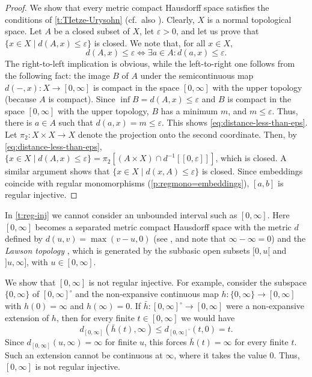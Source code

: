 \documentclass[11pt]{amsart}
\theoremstyle{definition}
\begin{document}
\begin{proof}
  We show that every metric compact Hausdorff space satisfies the conditions of \cref{t:TIetze-Urysohn} (cf.\ also \cite[Lem.~1.9]{BenYaacov2008}).
  Clearly, $X$ is a normal topological space.
  Let $A$ be a closed subset of $X$, let $\varepsilon >0$, and let us prove that $\{x \in X \mid d(A, x) \leq \varepsilon\}$ is closed.
  We note that, for all $x \in X$,
  \begin{equation} \label{eq:distance-less-than-eps}
  d(A,x) \leq \varepsilon \iff \exists a \in A : d(a,x) \leq \varepsilon.
  \end{equation}
  The right-to-left implication is obvious, while the left-to-right one follows from the following fact: the image $B$ of $A$ under the semicontinuous map $d(-,x) \colon X \to [0, \infty]$ is compact in the space $[0, \infty]$ with the upper topology (because $A$ is compact).
 Since $\inf B = d(A,x) \leq \varepsilon $ and $B$ is compact in the space $[0, \infty]$ with the upper topology, $B$ has a minimum $m$, and $m \leq \varepsilon$.
 Thus, there is $a \in A$ such that $d(a,x) = m \leq \varepsilon $.
 This shows \eqref{eq:distance-less-than-eps}.
 Let $\pi_2 \colon X \times X \to X$ denote the projection onto the second coordinate.
 Then, by \eqref{eq:distance-less-than-eps}, $\{ x \in X \mid d(A, x) \leq \varepsilon\} = \pi_2[(A \times X) \cap d^{-1}[[0,\varepsilon]]]$, which is closed.
 A similar argument shows that $\{ x \in X \mid d(x,A) \leq \varepsilon\}$ is closed.
Since embeddings coincide with regular monomorphisms (\cref{p:regmono=embeddings}), $[a,b]$ is regular injective.
\end{proof}


\begin{remark}
  In \cref{t:reg-inj} we cannot consider an unbounded interval such as \([0,\infty]\).
  Here \([0,\infty]\) becomes a separated metric compact Hausdorff space with the metric \(d\) defined by $d(u,v) = \max(v - u, 0)$ (see \cite{Law73}, and note that \(\infty-\infty=0\)) and the \emph{Lawson topology} \cite{GHK+03}, which is generated by the subbasic open subsets $[0,u[$ and $]u,\infty]$, with $u\in [0,\infty]$.
  
  We show that \([0,\infty]\) is not regular injective.
  For example, consider the subspace \(\{0,\infty\}\) of \([0,\infty]^{\circ}\) and the non-expansive continuous map $h\colon \{0,\infty\}\to [0,\infty]$ with $h(0)=\infty$ and $h(\infty)=0$.
  If $\bar{h}\colon [0,\infty]^{\circ}\to [0,\infty]$ were a non-expansive extension of \(h\), then for every finite $t\in [0,\infty]$ we would have
  \[
    d_{[0,\infty]}(\bar{h}(t),\infty)
      \leq d_{[0,\infty]^{\circ}}(t,0)=t.
  \]
  Since $d_{[0,\infty]}(u,\infty)=\infty$ for finite $u$, this forces $\bar{h}(t)=\infty$ for every finite $t$. Such an extension cannot be continuous at $\infty$, where it takes the value $0$. Thus, $[0,\infty]$ is not regular injective.
\end{remark}
\end{document}
